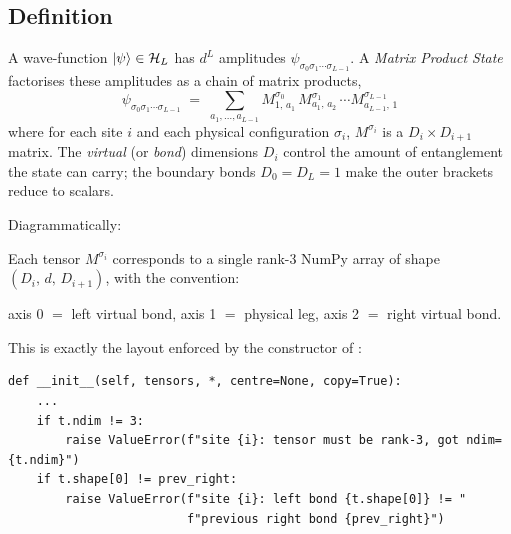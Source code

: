 \documentclass[11pt,a4paper]{article}
\theoremstyle{plain}
\theoremstyle{definition}
\theoremstyle{remark}
\newcommand{\Hilb}{\mathcal{H}}
\newcommand{\dphys}{d}
\newcommand{\Dvirt}{D}
\newcommand{\codefile}[1]{\path{#1}}
\begin{document}
\subsection{Definition}

A wave-function $\ket{\psi} \in \Hilb_L$ has $\dphys^L$ amplitudes
$\psi_{\sigma_0 \sigma_1 \cdots \sigma_{L-1}}$.  A \emph{Matrix Product State}
factorises these amplitudes as a chain of matrix products,
\begin{equation}
  \boxed{\;
  \psi_{\sigma_0 \sigma_1 \cdots \sigma_{L-1}}
  \;=\;
  \sum_{a_1,\dots,a_{L-1}}
  M^{\sigma_0}_{1,\,a_1}\,
  M^{\sigma_1}_{a_1,\,a_2}\,
  \cdots
  M^{\sigma_{L-1}}_{a_{L-1},\,1}\;}
\end{equation}
where for each site $i$ and each physical configuration $\sigma_i$,
$M^{\sigma_i}$ is a $\Dvirt_i \times \Dvirt_{i+1}$ matrix.  The
\emph{virtual} (or \emph{bond}) dimensions $\Dvirt_i$ control the amount of
entanglement the state can carry; the boundary bonds $\Dvirt_0 = \Dvirt_L = 1$
make the outer brackets reduce to scalars.

Diagrammatically:

\begin{center}
\end{center}

Each tensor $M^{\sigma_i}$ corresponds to a single rank-3 NumPy array of shape
$(\Dvirt_i,\,\dphys,\,\Dvirt_{i+1})$, with the convention:

\smallskip
\begin{center}\small
  axis 0 $=$ left virtual bond, \quad
  axis 1 $=$ physical leg, \quad
  axis 2 $=$ right virtual bond.
\end{center}
\smallskip

This is exactly the layout enforced by the constructor of
\codefile{src/dmrg_pp/states/mps.py}:
\begin{lstlisting}
def __init__(self, tensors, *, centre=None, copy=True):
    ...
    if t.ndim != 3:
        raise ValueError(f"site {i}: tensor must be rank-3, got ndim={t.ndim}")
    if t.shape[0] != prev_right:
        raise ValueError(f"site {i}: left bond {t.shape[0]} != "
                         f"previous right bond {prev_right}")
\end{lstlisting}
\end{document}
